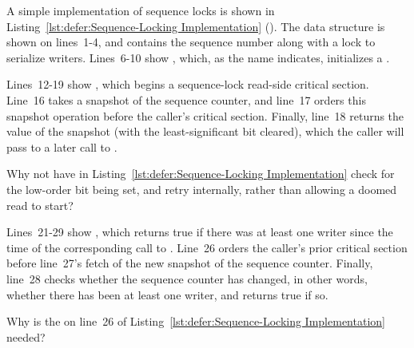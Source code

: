 A simple implementation of sequence locks is shown in
Listing~\ref{lst:defer:Sequence-Locking Implementation}
().
The  data structure is shown on lines~1-4, and contains
the sequence number along with a lock to serialize writers.
Lines~6-10 show , which, as the name indicates,
initializes a .

Lines~12-19 show , which begins a sequence-lock
read-side critical section.
Line~16 takes a snapshot of the sequence counter, and line~17 orders
this snapshot operation before the caller's critical section.
Finally, line~18 returns the value of the snapshot (with the least-significant
bit cleared), which the caller
will pass to a later call to .

\QuickQuiz{}
	Why not have  in
	Listing~\ref{lst:defer:Sequence-Locking Implementation}
	check for the low-order bit being set, and retry
	internally, rather than allowing a doomed read to start?
 \QuickQuizEnd

Lines~21-29 show , which returns true if there
was at least one writer since the time of the corresponding
call to .
Line~26 orders the caller's prior critical section before line~27's
fetch of the new snapshot of the sequence counter.
Finally, line~28 checks whether the sequence counter has changed,
in other words, whether there has been at least one writer, and returns
true if so.

\QuickQuiz{}
	Why is the  on line~26 of
	Listing~\ref{lst:defer:Sequence-Locking Implementation}
	needed?
 \QuickQuizEnd

